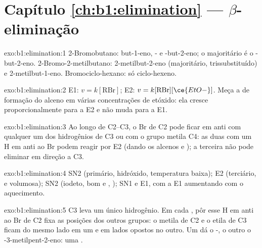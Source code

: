 \section*{Capítulo \ref{ch:b1:elimination} --- \texorpdfstring{$\beta$}{Beta}-eliminação}

\begin{solution}{exo:b1:elimination:1}
2-Bromobutano: but-1-eno, - e -but-2-eno; o majoritário é o
-but-2-eno. 2-Bromo-2-metilbutano: 2-metilbut-2-eno (majoritário,
trissubstituído) e 2-metilbut-1-eno. Bromociclo-hexano: só ciclo-hexeno.
\end{solution}

\begin{solution}{exo:b1:elimination:2}
E1: $v = k[\mathrm{RBr}]$; E2: $v = k[\mathrm{RBr}][\ce{EtO-}]$. Meça a
 de formação do alceno em várias concentrações de
etóxido: ela cresce proporcionalmente para a E2 e não muda para a E1.
\end{solution}

\begin{solution}{exo:b1:elimination:3}
Ao longo de C2--C3, o Br de C2 pode ficar em anti com qualquer um dos
hidrogênios de C3 ou com o grupo metila C4: as duas  com um H
em anti ao Br podem reagir por E2 (dando os alcenos  e );
a terceira não pode eliminar em direção a C3.
\end{solution}

\begin{solution}{exo:b1:elimination:4}
SN2 (primário, hidróxido, temperatura baixa); E2 (terciário, 
e volumosa); SN2 (iodeto, bom  e , ); SN1 e E1, com a E1 aumentando com o aquecimento.
\end{solution}

\begin{solution}{exo:b1:elimination:5}
C3 leva um único hidrogênio. Em cada , pôr esse H em anti
ao Br de C2 fixa as posições dos outros grupos: o metila de C2 e o etila
de C3 ficam do mesmo lado em um  e em lados opostos no
outro. Um dá o -, o outro o -3-metilpent-2-eno: uma .
\end{solution}

